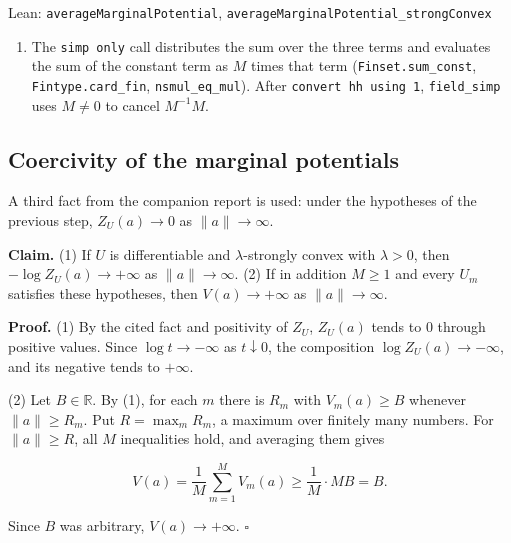 \documentclass[11pt,a4paper]{report}
\begin{document}
\begin{leanbox}{Lean: \texttt{averageMarginalPotential}, \texttt{averageMarginalPotential\_\allowbreak{}strongConvex}}
\begin{enumerate}
\item The \texttt{simp only} call distributes the sum over the three terms and evaluates the sum of the constant term as \(M\) times that term (\texttt{Finset.\allowbreak{}sum\_\allowbreak{}const}, \texttt{Fintype.\allowbreak{}card\_\allowbreak{}fin}, \texttt{nsmul\_\allowbreak{}eq\_\allowbreak{}mul}). After \texttt{convert hh using 1}, \texttt{field\_\allowbreak{}simp} uses \(M\ne0\) to cancel \(M^{-1}M\).

\end{enumerate}
\end{leanbox}
\subsection{\texorpdfstring{Coercivity of the marginal potentials}{Coercivity of the marginal potentials}}


A third fact from the companion report is used: under the hypotheses of the previous step, \(Z_U(a)\to0\) as \(\|a\|\to\infty\).




\textbf{Claim.} (1) If \(U\) is differentiable and \(\lambda\)-strongly convex with \(\lambda>0\), then \(-\log Z_U(a)\to+\infty\) as \(\|a\|\to\infty\). (2) If in addition \(M\ge1\) and every \(U_m\) satisfies these hypotheses, then \(V(a)\to+\infty\) as \(\|a\|\to\infty\).




\textbf{Proof.} (1) By the cited fact and positivity of \(Z_U\), \(Z_U(a)\) tends to \(0\) through positive values. Since \(\log t\to-\infty\) as \(t\downarrow0\), the composition \(\log Z_U(a)\to-\infty\), and its negative tends to \(+\infty\).




(2) Let \(B\in\mathbb R\). By (1), for each \(m\) there is \(R_m\) with \(V_m(a)\ge B\) whenever \(\|a\|\ge R_m\). Put \(R=\max_mR_m\), a maximum over finitely many numbers. For \(\|a\|\ge R\), all \(M\) inequalities hold, and averaging them gives


\[V(a)=\frac1M\sum_{m=1}^MV_m(a)\ge\frac1M\cdot MB=B.\]


Since \(B\) was arbitrary, \(V(a)\to+\infty\). \(\square\)
\end{document}
